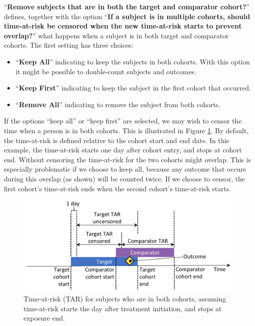\documentclass[11pt]{book}
\providecommand{\tightlist}{%
  \setlength{\itemsep}{0pt}\setlength{\parskip}{0pt}}
\theoremstyle{definition}
\theoremstyle{definition}
\theoremstyle{definition}
\theoremstyle{remark}
\begin{document}
``\textbf{Remove subjects that are in both the target and comparator cohort?}'' defines, together with the option ``\textbf{If a subject is in multiple cohorts, should time-at-risk be censored when the new time-at-risk starts to prevent overlap?}'' what happens when a subject is in both target and comparator cohorts. The first setting has three choices:

\begin{itemize}
\tightlist
\item
  ``\textbf{Keep All}'' indicating to keep the subjects in both cohorts. With this option it might be possible to double-count subjects and outcomes.
\item
  ``\textbf{Keep First}'' indicating to keep the subject in the first cohort that occurred.
\item
  ``\textbf{Remove All}'' indicating to remove the subject from both cohorts.
\end{itemize}

If the options ``keep all'' or ``keep first'' are selected, we may wish to censor the time when a person is in both cohorts. This is illustrated in Figure \ref{fig:tar}. By default, the time-at-risk is defined relative to the cohort start and end date. In this example, the time-at-risk starts one day after cohort entry, and stops at cohort end. Without censoring the time-at-risk for the two cohorts might overlap. This is especially problematic if we choose to keep all, because any outcome that occurs during this overlap (as shown) will be counted twice. If we choose to censor, the first cohort's time-at-risk ends when the second cohort's time-at-risk starts.

\begin{figure}

{\centering \includegraphics[width=0.8\linewidth]{images/PopulationLevelEstimation/tar} 

}

\caption{Time-at-risk (TAR) for subjects who are in both cohorts, assuming time-at-risk starts the day after treatment initiation, and stops at exposure end.}\label{fig:tar}
\end{figure}
\end{document}
